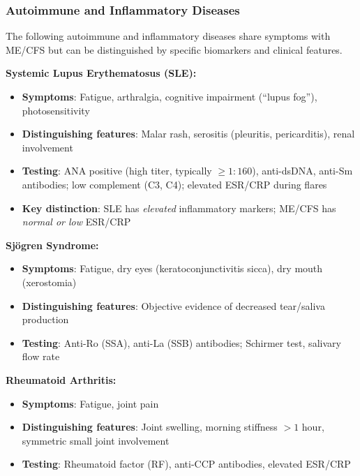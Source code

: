 \subsubsection{Autoimmune and Inflammatory Diseases}

\begin{observation}
\label{obs:inflammatory-distinction}
The following autoimmune and inflammatory diseases share symptoms with ME/CFS but can be distinguished by specific biomarkers and clinical features.
\end{observation}

\textbf{Systemic Lupus Erythematosus (SLE):}
\begin{itemize}
    \item \textbf{Symptoms}: Fatigue, arthralgia, cognitive impairment (``lupus fog''), photosensitivity
    \item \textbf{Distinguishing features}: Malar rash, serositis (pleuritis, pericarditis), renal involvement
    \item \textbf{Testing}: ANA positive (high titer, typically $\geq 1:160$), anti-dsDNA, anti-Sm antibodies; low complement (C3, C4); elevated ESR/CRP during flares
    \item \textbf{Key distinction}: SLE has \textit{elevated} inflammatory markers; ME/CFS has \textit{normal or low} ESR/CRP
\end{itemize}

\textbf{Sjögren Syndrome:}
\begin{itemize}
    \item \textbf{Symptoms}: Fatigue, dry eyes (keratoconjunctivitis sicca), dry mouth (xerostomia)
    \item \textbf{Distinguishing features}: Objective evidence of decreased tear/saliva production
    \item \textbf{Testing}: Anti-Ro (SSA), anti-La (SSB) antibodies; Schirmer test, salivary flow rate
\end{itemize}

\textbf{Rheumatoid Arthritis:}
\begin{itemize}
    \item \textbf{Symptoms}: Fatigue, joint pain
    \item \textbf{Distinguishing features}: Joint swelling, morning stiffness $>1$ hour, symmetric small joint involvement
    \item \textbf{Testing}: Rheumatoid factor (RF), anti-CCP antibodies, elevated ESR/CRP
\end{itemize}

